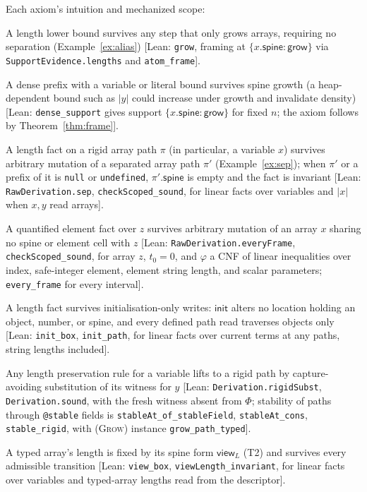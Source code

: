 \documentclass[10pt,a4paper]{article}
\theoremstyle{definition}
\theoremstyle{remark}
\newcommand{\kw}[1]{\mathsf{#1}}
\newcommand{\init}{\kw{init}}
\newcommand{\grow}{\kw{grow}}
\newcommand{\len}[1]{|#1|}
\newcommand{\code}[1]{\texttt{#1}}
\newcommand{\lean}[1]{\texttt{\small #1}}
\newcommand{\status}[1]{\textsf{\small[#1]}}
\begin{document}
\noindent
Each axiom's intuition and mechanized scope:
\begin{description}[leftmargin=1.5em,style=nextline]
\item[\textsc{(Grow)}] A length lower bound survives any step that only
grows arrays, requiring no separation (Example~\ref{ex:alias})
\status{Lean: \lean{grow}, framing at $\{x.\kw{spine}:\grow\}$ via \lean{SupportEvidence.lengths} and \lean{atom\_frame}}.
\item[\textsc{(Dense)}] A dense prefix with a variable or literal bound
survives spine growth (a heap-dependent bound such as $\len y$ could
increase under growth and invalidate density)
\status{Lean: \lean{dense\_support} gives support $\{x.\kw{spine}:\grow\}$ for fixed $n$; the axiom follows by Theorem~\ref{thm:frame}}.
\item[\textsc{(Sep)}] A length fact on a rigid array path $\pi$ (in
particular, a variable $x$) survives arbitrary mutation of a separated
array path $\pi'$ (Example~\ref{ex:sep}); when $\pi'$ or a prefix of it is
\code{null} or \code{undefined}, $\pi'.\kw{spine}$ is empty and the fact
is invariant
\status{Lean: \lean{RawDerivation.sep}, \lean{checkScoped\_sound}, for linear facts over variables and $\len x$ when $x,y$ read arrays}.
\item[\textsc{(Every)}] A quantified element fact over $z$ survives
arbitrary mutation of an array $x$ sharing no spine or element cell with
$z$
\status{Lean: \lean{RawDerivation.everyFrame}, \lean{checkScoped\_sound}, for array $z$, $t_0=0$, and $\varphi$ a CNF of linear inequalities over index, safe-integer element, element string length, and scalar parameters; \lean{every\_frame} for every interval}.
\item[\textsc{(Init)}] A length fact survives initialisation-only writes:
$\init$ alters no location holding an object, number, or spine, and every
defined path read traverses objects only
\status{Lean: \lean{init\_box}, \lean{init\_path}, for linear facts over current terms at any paths, string lengths included}.
\item[\textsc{(Rigid)}] Any length preservation rule for a variable lifts
to a rigid path by capture-avoiding substitution of its witness for $y$
\status{Lean: \lean{Derivation.rigidSubst}, \lean{Derivation.sound}, with the fresh witness absent from $\Phi$; stability of paths through \code{@stable} fields is \lean{stableAt\_of\_stableField}, \lean{stableAt\_cons}, \lean{stable\_rigid}, with \textsc{(Grow)} instance \lean{grow\_path\_typed}}.
\item[\textsc{(View)}] A typed array's length is fixed by its spine form
$\mathsf{view}_L$ (T2) and survives every admissible transition
\status{Lean: \lean{view\_box}, \lean{viewLength\_invariant}, for linear facts over variables and typed-array lengths read from the descriptor}.
\end{description}
\end{document}
